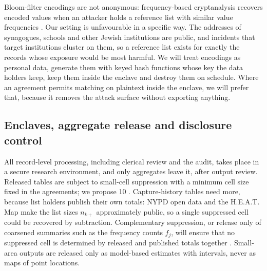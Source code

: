 Bloom-filter encodings are not anonymous: frequency-based cryptanalysis recovers encoded values when an attacker holds a reference list with similar value frequencies \citep{kuzu2011,niedermeyer2014,christen2019}. Our setting is unfavourable in a specific way. The addresses of synagogues, schools and other Jewish institutions are public, and incidents that target institutions cluster on them, so a reference list exists for exactly the records whose exposure would be most harmful. We will treat encodings as personal data, generate them with keyed hash functions whose key the data holders keep, keep them inside the enclave and destroy them on schedule. Where an agreement permits matching on plaintext inside the enclave, we will prefer that, because it removes the attack surface without exporting anything.

\subsection{Enclaves, aggregate release and disclosure control}\label{sec:ethics-sdc}

All record-level processing, including clerical review and the audit, takes place in a secure research environment, and only aggregates leave it, after output review. Released tables are subject to small-cell suppression with a minimum cell size fixed in the agreements; we propose 10 \citep{hundepool2012}. Capture-history tables need more, because list holders publish their own totals: NYPD open data and the H.E.A.T. Map make the list sizes $n_{k+}$ approximately public, so a single suppressed cell could be recovered by subtraction. Complementary suppression, or release only of coarsened summaries such as the frequency counts $f_j$, will ensure that no suppressed cell is determined by released and published totals together \citep{hundepool2012}. Small-area outputs are released only as model-based estimates with intervals, never as maps of point locations.

